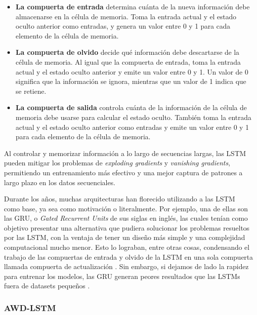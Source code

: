 \begin{itemize}
    \item \textbf{La compuerta de entrada} determina cuánta de la nueva información debe almacenarse en la célula de memoria. Toma la entrada actual y el estado oculto anterior como entradas, y genera un valor entre 0 y 1 para cada elemento de la célula de memoria.
    \item \textbf{La compuerta de olvido} decide qué información debe descartarse de la célula de memoria. Al igual que la compuerta de entrada, toma la entrada actual y el estado oculto anterior y emite un valor entre 0 y 1. Un valor de 0 significa que la información se ignora, mientras que un valor de 1 indica que se retiene.
    \item \textbf{La compuerta de salida} controla cuánta de la información de la célula de memoria debe usarse para calcular el estado oculto. También toma la entrada actual y el estado oculto anterior como entradas y emite un valor entre 0 y 1 para cada elemento de la célula de memoria.
\end{itemize}

Al controlar y memorizar información a lo largo de secuencias largas, las LSTM pueden mitigar los problemas de \textit{exploding gradients} y \textit{vanishing gradients}, permitiendo un entrenamiento más efectivo y una mejor captura de patrones a largo plazo en los datos secuenciales.

Durante los años, muchas arquitecturas han florecido utilizando a las LSTM como base, ya sea como motivación o literalmente. Por ejemplo, una de ellas son las GRU, o \textit{Gated Recurrent Units} de sus siglas en inglés, las cuales tenían como objetivo presentar una alternativa que pudiera solucionar los problemas resueltos por las LSTM, con la ventaja de tener un diseño más simple y una complejidad computacional mucho menor. Esto lo lograban, entre otras cosas, condensando el trabajo de las compuertas de entrada y olvido de la LSTM en una sola compuerta llamada compuerta de actualización \parencite{chung2014empiricalevaluationgatedrecurrent}. Sin embargo, si dejamos de lado la rapidez para entrenar los modelos, las GRU generan peores resultados que las LSTMs fuera de datasets pequeños \parencite{lstmandgru}.

\subsubsection{AWD-LSTM}

\label{sec:awd-lstm}

